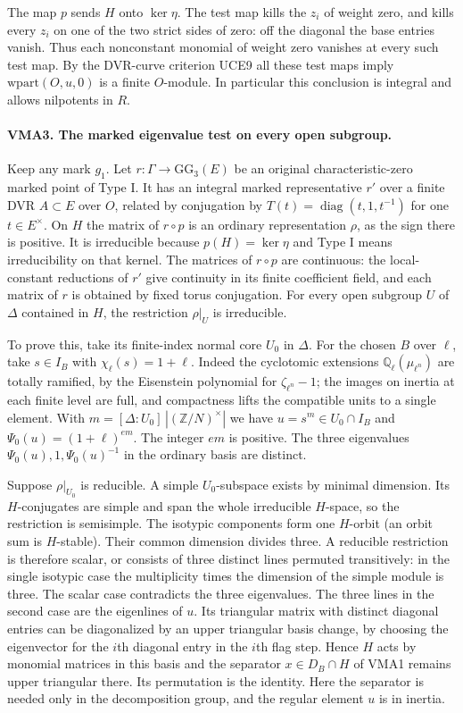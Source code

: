 The map $p$ sends $H$ onto $\ker\eta$. The test map kills the $z_i$
of weight zero, and kills every $z_i$ on one of the two strict sides
of zero: off the diagonal the base entries vanish. Thus each
nonconstant monomial of weight zero vanishes at every such test
map. By the DVR-curve criterion UCE9 all these test maps imply
$\mathrm{wpart}(O,u,0)$ is a finite $O$-module. In particular
this conclusion is integral and allows nilpotents in $R$.

\paragraph{VMA3. The marked eigenvalue test on every open subgroup.}
\label{claim:VMA3}
Keep any mark $g_1$. Let $r:\Gamma\to\mathrm{GG}_3(E)$ be an
original characteristic-zero marked point of Type I. It has an
integral marked representative $r'$ over a finite DVR $A\subset E$
over $O$, related by conjugation by $T(t)=\operatorname{diag}(t,1,t^{-1})$
for one $t\in E^\times$. On $H$ the matrix of $r\circ p$ is an
ordinary representation $\rho$, as the sign there is positive.
It is irreducible because $p(H)=\ker\eta$ and Type I means
irreducibility on that kernel. The matrices of $r\circ p$ are
continuous: the local-constant reductions of $r'$ give continuity
in its finite coefficient field, and each matrix of $r$ is obtained
by fixed torus conjugation. For every open subgroup $U$ of
$\Delta$ contained in $H$, the restriction $\rho|_U$ is irreducible.

To prove this, take its finite-index normal core $U_0$ in $\Delta$.
For the chosen $B$ over $\ell$, take $s\in I_B$ with
$\chi_\ell(s)=1+\ell$. Indeed the cyclotomic extensions
$\mathbb Q_\ell(\mu_{\ell^n})$ are totally ramified, by the
Eisenstein polynomial for $\zeta_{\ell^n}-1$; the images on
inertia at each finite level are full, and compactness lifts the
compatible units to a single element. With
$m=[\Delta:U_0]\,|(\mathbb Z/N)^\times|$ we have
$u=s^m\in U_0\cap I_B$ and $\Psi_0(u)=(1+\ell)^{em}$.
The integer $em$ is positive. The three eigenvalues
$\Psi_0(u),1,\Psi_0(u)^{-1}$ in the ordinary basis are distinct.

Suppose $\rho|_{U_0}$ is reducible. A simple $U_0$-subspace exists
by minimal dimension. Its $H$-conjugates are simple and span the
whole irreducible $H$-space, so the restriction is semisimple.
The isotypic components form one $H$-orbit (an orbit sum is
$H$-stable). Their common dimension divides three. A reducible
restriction is therefore scalar, or consists of three distinct lines
permuted transitively: in the single isotypic case the multiplicity
times the dimension of the simple module is three. The scalar case
contradicts the three eigenvalues. The three lines in the second case
are the eigenlines of $u$. Its triangular matrix with distinct
diagonal entries can be diagonalized by an upper triangular basis
change, by choosing the eigenvector for the $i$th diagonal entry
in the $i$th flag step. Hence $H$ acts by monomial matrices in
this basis and the separator $x\in D_B\cap H$ of VMA1 remains
upper triangular there. Its permutation is the identity. Here the
separator is needed only in the decomposition group, and the
regular element $u$ is in inertia.

